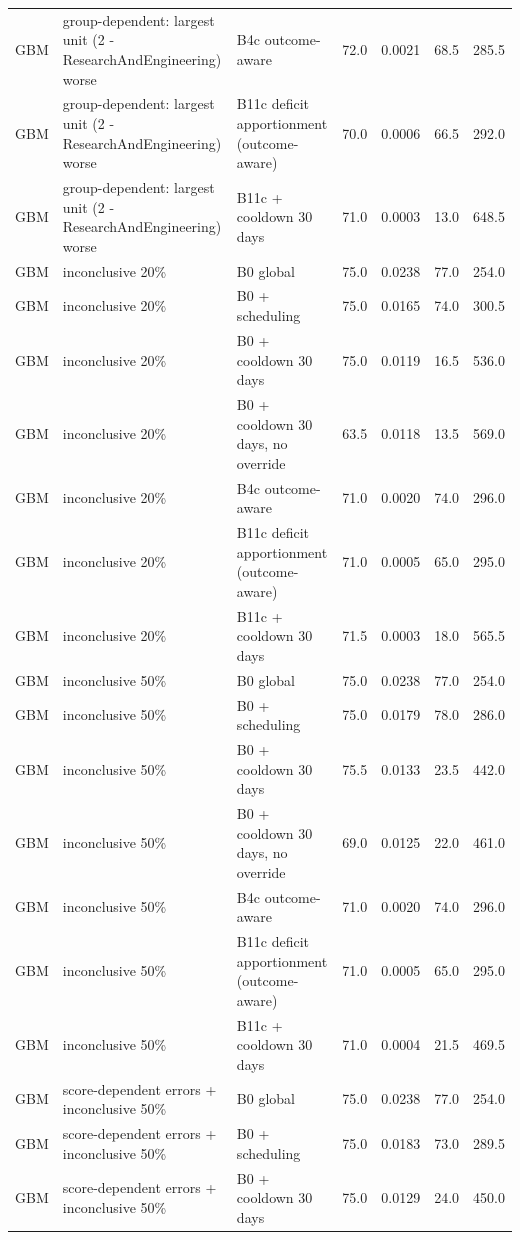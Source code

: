 \documentclass[10pt,onecolumn,letterpaper]{article}
\begin{document}
\begin{longtable}{lp{5.2cm}p{4.4cm}cccc}
GBM & group-dependent: largest unit (2 - ResearchAndEngineering) worse & B4c outcome-aware & 72.0 & 0.0021 & 68.5 & 285.5 \\
GBM & group-dependent: largest unit (2 - ResearchAndEngineering) worse & B11c deficit apportionment (outcome-aware) & 70.0 & 0.0006 & 66.5 & 292.0 \\
GBM & group-dependent: largest unit (2 - ResearchAndEngineering) worse & B11c + cooldown 30 days & 71.0 & 0.0003 & 13.0 & 648.5 \\
GBM & inconclusive 20\% & B0 global & 75.0 & 0.0238 & 77.0 & 254.0 \\
GBM & inconclusive 20\% & B0 + scheduling & 75.0 & 0.0165 & 74.0 & 300.5 \\
GBM & inconclusive 20\% & B0 + cooldown 30 days & 75.0 & 0.0119 & 16.5 & 536.0 \\
GBM & inconclusive 20\% & B0 + cooldown 30 days, no override & 63.5 & 0.0118 & 13.5 & 569.0 \\
GBM & inconclusive 20\% & B4c outcome-aware & 71.0 & 0.0020 & 74.0 & 296.0 \\
GBM & inconclusive 20\% & B11c deficit apportionment (outcome-aware) & 71.0 & 0.0005 & 65.0 & 295.0 \\
GBM & inconclusive 20\% & B11c + cooldown 30 days & 71.5 & 0.0003 & 18.0 & 565.5 \\
GBM & inconclusive 50\% & B0 global & 75.0 & 0.0238 & 77.0 & 254.0 \\
GBM & inconclusive 50\% & B0 + scheduling & 75.0 & 0.0179 & 78.0 & 286.0 \\
GBM & inconclusive 50\% & B0 + cooldown 30 days & 75.5 & 0.0133 & 23.5 & 442.0 \\
GBM & inconclusive 50\% & B0 + cooldown 30 days, no override & 69.0 & 0.0125 & 22.0 & 461.0 \\
GBM & inconclusive 50\% & B4c outcome-aware & 71.0 & 0.0020 & 74.0 & 296.0 \\
GBM & inconclusive 50\% & B11c deficit apportionment (outcome-aware) & 71.0 & 0.0005 & 65.0 & 295.0 \\
GBM & inconclusive 50\% & B11c + cooldown 30 days & 71.0 & 0.0004 & 21.5 & 469.5 \\
GBM & score-dependent errors + inconclusive 50\% & B0 global & 75.0 & 0.0238 & 77.0 & 254.0 \\
GBM & score-dependent errors + inconclusive 50\% & B0 + scheduling & 75.0 & 0.0183 & 73.0 & 289.5 \\
GBM & score-dependent errors + inconclusive 50\% & B0 + cooldown 30 days & 75.0 & 0.0129 & 24.0 & 450.0 \\

\end{longtable}
\end{document}
